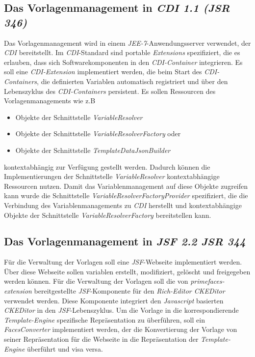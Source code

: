 \subsection{Das Vorlagenmanagement in \emph{CDI 1.1 (JSR 346)}}
\label{sec:sub-template-management-cdi}
Das Vorlagenmanagement wird in einem \emph{JEE-7}-Anwendungsserver verwendet, der \emph{CDI} bereitstellt. Im \emph{CDI}-Standard sind portable \emph{Extensions} spezifiziert, die es erlauben, dass sich Softwarekomponenten in den \emph{CDI-Container} integrieren. Es soll eine \emph{CDI-Extension} implementiert werden, die beim Start des \emph{CDI-Containers}, die definierten Variablen automatisch registriert und über den Lebenszyklus des \emph{CDI-Containers} persistent. Es sollen Ressourcen des Vorlagenmanagements wie z.B
\begin{itemize}
	\item Objekte der Schnittstelle \emph{VariableResolver}
	\item Objekte der Schnittstelle \emph{VariableResolverFactory} oder
	\item Objekte der Schnittstelle \emph{TemplateDataJsonBuilder}
\end{itemize}
kontextabhängig zur Verfügung gestellt werden. Dadurch können die Implementierungen der Schnittstelle \emph{VariableResolver} kontextabhängige Ressourcen nutzen. Damit das Variablenmanagement auf diese Objekte zugreifen kann wurde die Schnittstelle \emph{VariableResolverFactoryProvider} spezifiziert, die die Verbindung des Variablenmanagements zu \emph{CDI} herstellt und kontextabhängige Objekte der Schnittstelle \emph{VariableResolverFactory} bereitstellen kann.

\subsection{Das Vorlagenmanagement in \emph{JSF 2.2 JSR 344}}
Für die Verwaltung der Vorlagen soll eine \emph{JSF}-Webseite implementiert werden. Über diese Webseite sollen variablen erstellt, modifiziert, gelöscht und freigegeben werden können. Für die Verwaltung der Vorlagen soll die von \emph{primefaces-extension} bereitgestellte \emph{JSF}-Komponente für den \emph{Rich-Editor CKEDitor} verwendet werden. Diese Komponente integriert den \emph{Javascript} basierten \emph{CKEDitor} in den \emph{JSF}-Lebenszyklus. Um die Vorlage in die korrespondierende \emph{Template-Engine} spezifische Repräsentation zu überführen, soll ein \emph{FacesConverter} implementiert werden, der die Konvertierung der Vorlage von seiner Repräsentation für die Webseite in die Repräsentation der \emph{Template-Engine} überführt und visa versa.


